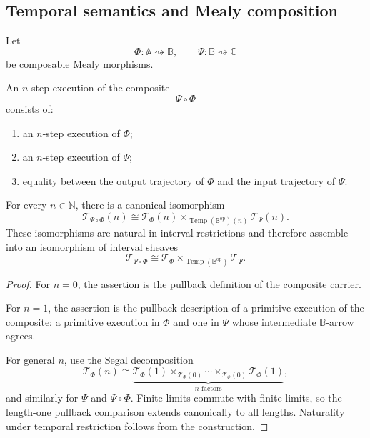\subsection{Temporal semantics and Mealy composition}
\label{subsec:temporal-semantics-mealy-composition}

Let
\[
    \Phi:\mathbb A\rightsquigarrow\mathbb B,
    \qquad
    \Psi:\mathbb B\rightsquigarrow\mathbb C
\]
be composable Mealy morphisms.

An \(n\)-step execution of the composite
\[
    \Psi\circ\Phi
\]
consists of:
\begin{enumerate}
    \item an \(n\)-step execution of \(\Phi\);
    \item an \(n\)-step execution of \(\Psi\);
    \item equality between the output trajectory of \(\Phi\) and the input
    trajectory of \(\Psi\).
\end{enumerate}

\begin{theorem}
\label{thm:temporal-composition}
For every \(n\in\mathbb N\), there is a canonical isomorphism
\[
    \mathscr T_{\Psi\circ\Phi}(n)
    \cong
    \mathscr T_\Phi(n)
    \times_{\operatorname{Temp}(\mathbb B^{\mathrm{op}})(n)}
    \mathscr T_\Psi(n).
\]
These isomorphisms are natural in interval restrictions and therefore assemble
into an isomorphism of interval sheaves
\[
    \mathscr T_{\Psi\circ\Phi}
    \cong
    \mathscr T_\Phi
    \times_{\operatorname{Temp}(\mathbb B^{\mathrm{op}})}
    \mathscr T_\Psi.
\]
\end{theorem}

\begin{proof}
For \(n=0\), the assertion is the pullback definition of the composite
carrier.

For \(n=1\), the assertion is the pullback description of a primitive
execution of the composite: a primitive execution in \(\Phi\) and one in
\(\Psi\) whose intermediate \(\mathbb B\)-arrow agrees.

For general \(n\), use the Segal decomposition
\[
    \mathscr T_\Phi(n)
    \cong
    \underbrace{
    \mathscr T_\Phi(1)
    \times_{\mathscr T_\Phi(0)}
    \cdots
    \times_{\mathscr T_\Phi(0)}
    \mathscr T_\Phi(1)
    }_{n\text{ factors}},
\]
and similarly for \(\Psi\) and \(\Psi\circ\Phi\). Finite limits commute with
finite limits, so the length-one pullback comparison extends canonically to
all lengths. Naturality under temporal restriction follows from the
construction.
\end{proof}

